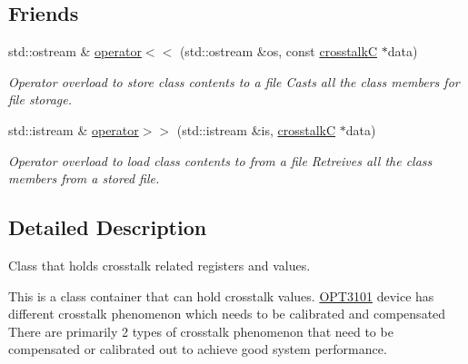 \subsection*{Friends}
\begin{DoxyCompactItemize}
\item 
std\+::ostream \& \mbox{\hyperlink{class_o_p_t3101_1_1crosstalk_c_a759466b2ca88c3105614f17a571e4d08}{operator$<$$<$}} (std\+::ostream \&os, const \mbox{\hyperlink{class_o_p_t3101_1_1crosstalk_c}{crosstalkC}} $\ast$data)
\begin{DoxyCompactList}\small\item\em Operator overload to store class contents to a file Casts all the class members for file storage. \end{DoxyCompactList}\item 
std\+::istream \& \mbox{\hyperlink{class_o_p_t3101_1_1crosstalk_c_a71fdefefe0fa23c7baaa915320867f7d}{operator$>$$>$}} (std\+::istream \&is, \mbox{\hyperlink{class_o_p_t3101_1_1crosstalk_c}{crosstalkC}} $\ast$data)
\begin{DoxyCompactList}\small\item\em Operator overload to load class contents to from a file Retreives all the class members from a stored file. \end{DoxyCompactList}\end{DoxyCompactItemize}


\subsection{Detailed Description}
Class that holds crosstalk related registers and values. 

This is a class container that can hold crosstalk values. \mbox{\hyperlink{namespace_o_p_t3101}{O\+P\+T3101}} device has different crosstalk phenomenon which needs to be calibrated and compensated~\newline
 There are primarily 2 types of crosstalk phenomenon that need to be compensated or calibrated out to achieve good system performance. ~\newline

